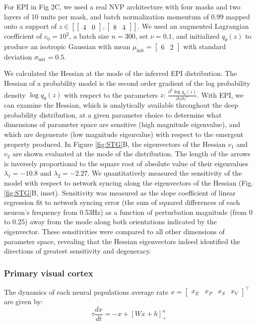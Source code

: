\documentclass[11pt]{article}
\begin{document}
For EPI in Fig 2C, we used a real NVP architecture with four masks and two layers of 10 units per mask, and batch normalization momentum of 0.99 mapped onto a support of $z \in \left[ \begin{bmatrix} 4 & 0 \end{bmatrix}, \begin{bmatrix} 8 & 4 \end{bmatrix} \right]$. We used an augmented Lagrangian coefficient of $c_0 = 10^{2}$, a batch size $n=300$, set $\nu = 0.1$, and initialized $q_\theta(z)$ to produce an isotropic Gaussian with mean $\mu_{\text{init}} = \begin{bmatrix} 6 & 2 \end{bmatrix}$ with standard deviation $\sigma_{\text{init}} = 0.5$.

We calculated the Hessian at the mode of the inferred EPI distribution.  
The Hessian of a probability model is the second order gradient of the log probability density $\log q_\theta(z)$ with respect to the parameters $z$:  $\frac{\partial^2 \log q_\theta(z)}{\partial z \partial z^\top}$.  
With EPI, we can examine the Hessian, which is analytically available throughout the deep probability distribution, at a given parameter choice to determine what dimensions of parameter space are sensitive (high magnitude eigenvalue), and which are degenerate (low magnitude eigenvalue) with respect to the emergent property produced. 
In Figure \ref{fig:STG}B, the eigenvectors of the Hessian $v_1$ and $v_2$ are shown evaluated at the mode of the distribution.  
The length of the arrows is inversely proportional to the square root of absolute value of their eigenvalues $\lambda_1 = -10.8$ and $\lambda_2 = -2.27$.
We quantitatively measured the sensitivity of the model with respect to network syncing along the eigenvectors of the Hessian (Fig. \ref{fig:STG}B, inset).
Sensitivity was measured as the slope coefficient of linear regression fit to network syncing error (the sum of squared differences of each neuron's frequency from 0.53Hz) as a function of perturbation magnitude (from 0 to 0.25) away from the mode along both orientations indicated by the eigenvector.
These sensitivities were compared to all other dimensions of parameter space, revealing that the Hessian eigenvectors indeed identified the directions of greatest sensitivity and degeneracy.


\subsubsection{Primary visual cortex}\label{methods_V1}
The dynamics of each neural populations average rate
$x = \begin{bmatrix} x_E & x_P & x_S & x_V \end{bmatrix}^\top$
are given by:
\begin{equation}
\tau \frac{dx}{dt} = -x + [W x+ h]_+^n
\end{equation}
\end{document}
